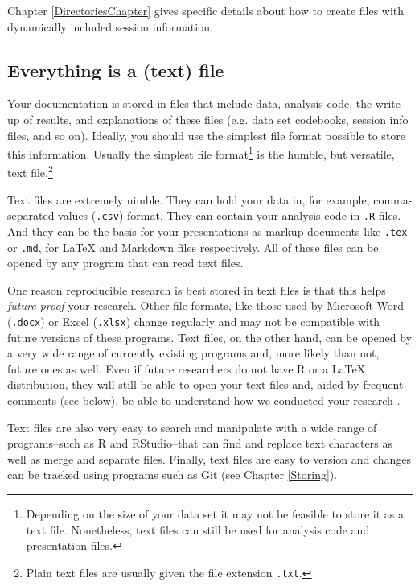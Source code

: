 {{{}}
\noindent Chapter \ref{DirectoriesChapter} gives specific details about how to create files with dynamically included session information.

\subsection{Everything is a (text) file}

Your documentation is stored in files that include data, analysis code, the write up of results, and explanations of these files (e.g. data set codebooks, session info files, and so on). Ideally, you should use the simplest file format possible to store this information. Usually the simplest file format\footnote{Depending on the size of your data set it may not be feasible to store it as a text file. Nonetheless, text files can still be used for analysis code and presentation files.}  is the humble, but versatile, text file.\footnote{Plain text files are usually given the file extension \texttt{.txt}.}

Text files are extremely nimble. They can hold your data in, for example, comma-separated values ({\tt{.csv}})  format. They can contain your analysis code in {\tt{.R}} files. And they can be the basis for your presentations as markup documents like {\tt{.tex}} or {\tt{.md}}, for LaTeX and Markdown files respectively. All of these files can be opened by any program that can read text files. 

One reason reproducible research is best stored in text files is that this helps {\emph{future proof}} your research. Other file formats, like those used by Microsoft Word  (\texttt{.docx}) or Excel (\texttt{.xlsx}) change regularly and may not be compatible with future versions of these programs. Text files, on the other hand, can be opened by a very wide range of currently existing programs and, more likely than not, future ones as well. Even if future researchers do not have R or a LaTeX distribution, they will still be able to open your text files and, aided by frequent comments (see below), be able to understand how we conducted your research \cite[3]{Bowers2011}.

Text files are also very easy to search and manipulate with a wide range of programs--such as R and RStudio--that can find and replace text characters as well as merge and separate files. Finally, text files are easy to version and changes can be tracked using programs such as Git (see Chapter \ref{Storing}).   

}
